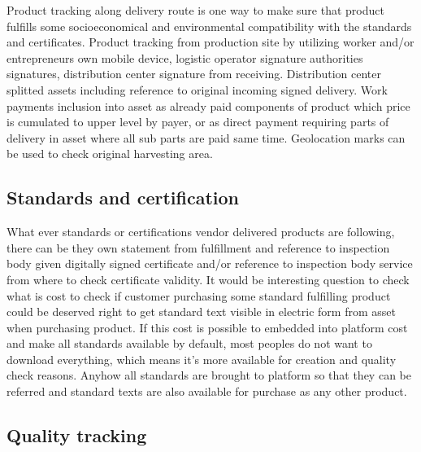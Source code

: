 Product tracking along delivery route is one way to make sure that product
fulfills some socioeconomical and environmental compatibility with the
standards and certificates. Product tracking from production site by
utilizing worker and/or en\-tre\-pre\-neurs own mobile device, logistic
operator signature authorities signatures, distribution center signature from
receiving. Distribution center splitted assets including reference to original
incoming signed delivery. Work payments inclusion into asset as already paid
components of product which price is cumulated to upper level by payer, or as
direct payment requiring parts of delivery in asset where all sub parts are
paid same time. Geolocation marks can be used to check original harvesting area.

\subsection{Standards and certification}
\label{standards_and_certification}

What ever standards or certifications vendor delivered products are following,
there can be they own statement from fulfillment and reference to inspection
body given digitally signed certificate and/or reference to inspection body
service from where to check certificate validity. It would be interesting
question to check what is cost to check if customer purchasing some standard
fulfilling product could be deserved right to get standard text visible in
electric form from asset when purchasing product. If this cost is possible to
embedded into platform cost and make all standards available by default, most
peoples do not want to download everything, which means it's more available
for creation and quality check reasons. Anyhow all standards are brought to
platform so that they can be referred and standard texts are also available
for purchase as any other product.

\subsection{Quality tracking}
\label{quality_tracking}

